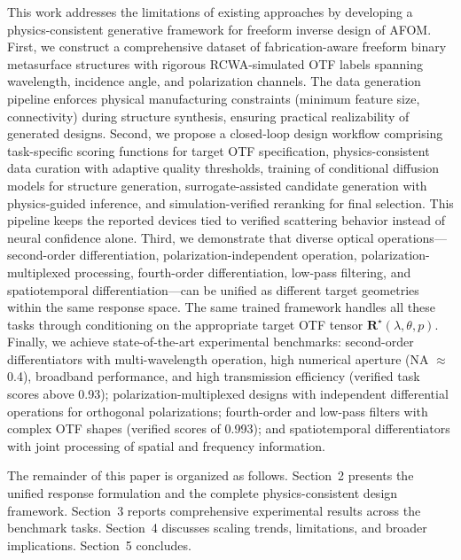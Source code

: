 This work addresses the limitations of existing approaches by developing a physics-consistent generative framework for freeform inverse design of AFOM. First, we construct a comprehensive dataset of fabrication-aware freeform binary metasurface structures with rigorous RCWA-simulated OTF labels spanning wavelength, incidence angle, and polarization channels. The data generation pipeline enforces physical manufacturing constraints (minimum feature size, connectivity) during structure synthesis, ensuring practical realizability of generated designs. Second, we propose a closed-loop design workflow comprising task-specific scoring functions for target OTF specification, physics-consistent data curation with adaptive quality thresholds, training of conditional diffusion models for structure generation, surrogate-assisted candidate generation with physics-guided inference, and simulation-verified reranking for final selection. This pipeline keeps the reported devices tied to verified scattering behavior instead of neural confidence alone. Third, we demonstrate that diverse optical operations---second-order differentiation, polarization-independent operation, polarization-multiplexed processing, fourth-order differentiation, low-pass filtering, and spatiotemporal differentiation---can be unified as different target geometries within the same response space. The same trained framework handles all these tasks through conditioning on the appropriate target OTF tensor $\mathbf{R}^\star(\lambda, \theta, p)$. Finally, we achieve state-of-the-art experimental benchmarks: second-order differentiators with multi-wavelength operation, high numerical aperture (NA $\approx$ 0.4), broadband performance, and high transmission efficiency (verified task scores above 0.93); polarization-multiplexed designs with independent differential operations for orthogonal polarizations; fourth-order and low-pass filters with complex OTF shapes (verified scores of 0.993); and spatiotemporal differentiators with joint processing of spatial and frequency information.

The remainder of this paper is organized as follows. Section~2 presents the unified response formulation and the complete physics-consistent design framework. Section~3 reports comprehensive experimental results across the benchmark tasks. Section~4 discusses scaling trends, limitations, and broader implications. Section~5 concludes.
